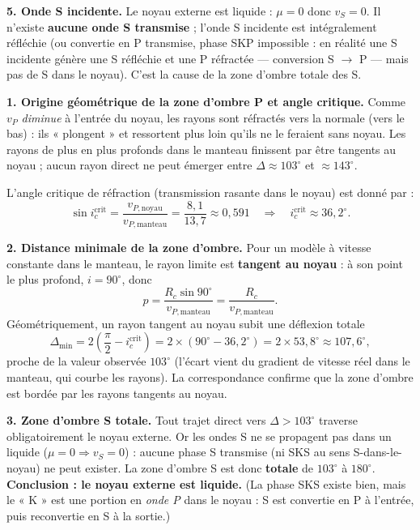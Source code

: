 \documentclass[11pt]{article}
\begin{document}
\begin{corrige}
\textbf{5. Onde S incidente.} Le noyau externe est liquide : $\mu = 0$ donc $v_S = 0$. Il n'existe \textbf{aucune onde S transmise} ; l'onde S incidente est intégralement réfléchie (ou convertie en P transmise, phase SKP impossible : en réalité une S incidente génère une S réfléchie et une P réfractée --- conversion S $\to$ P --- mais pas de S dans le noyau). C'est la cause de la zone d'ombre totale des S.
\end{corrige}

\begin{corrige}
\textbf{1. Origine géométrique de la zone d'ombre P et angle critique.} Comme $v_P$ \emph{diminue} à l'entrée du noyau, les rayons sont réfractés vers la normale (vers le bas) : ils « plongent » et ressortent plus loin qu'ils ne le feraient sans noyau. Les rayons de plus en plus profonds dans le manteau finissent par être tangents au noyau ; aucun rayon direct ne peut émerger entre $\Delta \approx 103^\circ$ et $\approx 143^\circ$.

L'angle critique de réfraction (transmission rasante dans le noyau) est donné par :
\[ \sin i_c^{\text{crit}} = \frac{v_{P,\text{noyau}}}{v_{P,\text{manteau}}} = \frac{8{,}1}{13{,}7} \approx 0{,}591 \quad\Rightarrow\quad i_c^{\text{crit}} \approx 36{,}2^\circ. \]

\textbf{2. Distance minimale de la zone d'ombre.} Pour un modèle à vitesse constante dans le manteau, le rayon limite est \textbf{tangent au noyau} : à son point le plus profond, $i = 90^\circ$, donc
\[ p = \frac{R_c \sin 90^\circ}{v_{P,\text{manteau}}} = \frac{R_c}{v_{P,\text{manteau}}}. \]
Géométriquement, un rayon tangent au noyau subit une déflexion totale
\[ \Delta_{\min} = 2\left(\frac{\pi}{2} - i_c^{\text{crit}}\right) = 2 \times (90^\circ - 36{,}2^\circ) = 2 \times 53{,}8^\circ \approx 107{,}6^\circ, \]
proche de la valeur observée $103^\circ$ (l'écart vient du gradient de vitesse réel dans le manteau, qui courbe les rayons). La correspondance confirme que la zone d'ombre est bordée par les rayons tangents au noyau.

\textbf{3. Zone d'ombre S totale.} Tout trajet direct vers $\Delta > 103^\circ$ traverse obligatoirement le noyau externe. Or les ondes S ne se propagent pas dans un liquide ($\mu = 0 \Rightarrow v_S = 0$) : aucune phase S transmise (ni SKS au sens S-dans-le-noyau) ne peut exister. La zone d'ombre S est donc \textbf{totale} de $103^\circ$ à $180^\circ$. \textbf{Conclusion : le noyau externe est liquide.} (La phase SKS existe bien, mais le « K » est une portion en \emph{onde P} dans le noyau : S est convertie en P à l'entrée, puis reconvertie en S à la sortie.)


\end{corrige}
\end{document}
